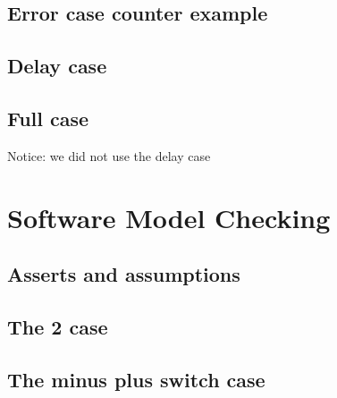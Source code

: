 \documentclass[a4paper]{article}
\begin{document}
	
	\subsection{Error case counter example}
	
	
	\subsection{Delay case}
	
	
	\subsection{Full case}
	Notice: we did not use the delay case
	
	
	\section{Software Model Checking}
	
	
	\subsection{Asserts and assumptions}
	
	
	\subsection{The 2 case}
	
	
	\subsection{The minus plus switch case}
	
	
	
\end{document}
